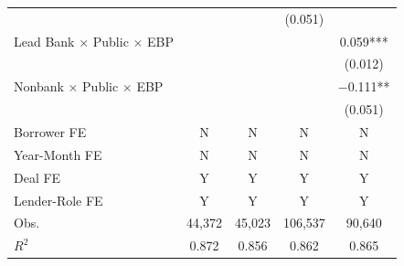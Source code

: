 {\begin{tabular}{l*{4}{c}}
                                        &               &               &     (0.051)   &               \\
[1em]
Lead Bank $\times$ Public $\times$ EBP  &               &               &               &       0.059***\\
                                        &               &               &               &     (0.012)   \\
[1em]
Nonbank $\times$ Public $\times$ EBP    &               &               &               &    $-$0.111** \\
                                        &               &               &               &     (0.051)   \\
\toprule
Borrower FE                             &           N   &           N   &           N   &           N   \\
Year-Month FE                           &           N   &           N   &           N   &           N   \\
Deal FE                                 &           Y   &           Y   &           Y   &           Y   \\
Lender-Role FE                          &           Y   &           Y   &           Y   &           Y   \\
Obs.                                    &      44,372   &      45,023   &     106,537   &      90,640   \\
$R^2$                                   &       0.872   &       0.856   &       0.862   &       0.865   \\
\toprule\toprule
\end{tabular}
}
